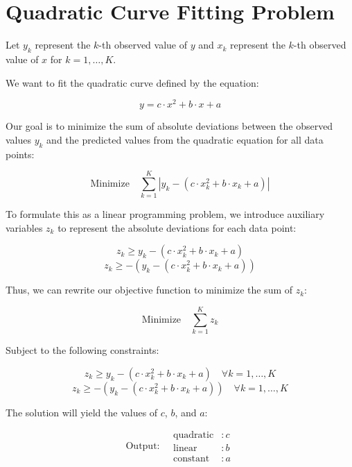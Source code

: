 \documentclass{article}
\begin{document}
\section*{Quadratic Curve Fitting Problem}

Let \( y_k \) represent the \( k \)-th observed value of \( y \) and \( x_k \) represent the \( k \)-th observed value of \( x \) for \( k = 1, \ldots, K \).

We want to fit the quadratic curve defined by the equation:

\[
y = c \cdot x^2 + b \cdot x + a
\]

Our goal is to minimize the sum of absolute deviations between the observed values \( y_k \) and the predicted values from the quadratic equation for all data points:

\[
\text{Minimize} \quad \sum_{k=1}^{K} |y_k - (c \cdot x_k^2 + b \cdot x_k + a)|
\]

To formulate this as a linear programming problem, we introduce auxiliary variables \( z_k \) to represent the absolute deviations for each data point:

\[
z_k \geq y_k - (c \cdot x_k^2 + b \cdot x_k + a)
\]
\[
z_k \geq -(y_k - (c \cdot x_k^2 + b \cdot x_k + a))
\]

Thus, we can rewrite our objective function to minimize the sum of \( z_k \):

\[
\text{Minimize} \quad \sum_{k=1}^{K} z_k
\]

Subject to the following constraints:

\[
z_k \geq y_k - (c \cdot x_k^2 + b \cdot x_k + a) \quad \forall k = 1, \ldots, K
\]
\[
z_k \geq -(y_k - (c \cdot x_k^2 + b \cdot x_k + a)) \quad \forall k = 1, \ldots, K
\]

The solution will yield the values of \( c \), \( b \), and \( a \):

\[
\text{Output:} \quad 
\begin{align*}
\text{quadratic} & : c \\
\text{linear} & : b \\
\text{constant} & : a 
\end{align*}
\]
\end{document}
